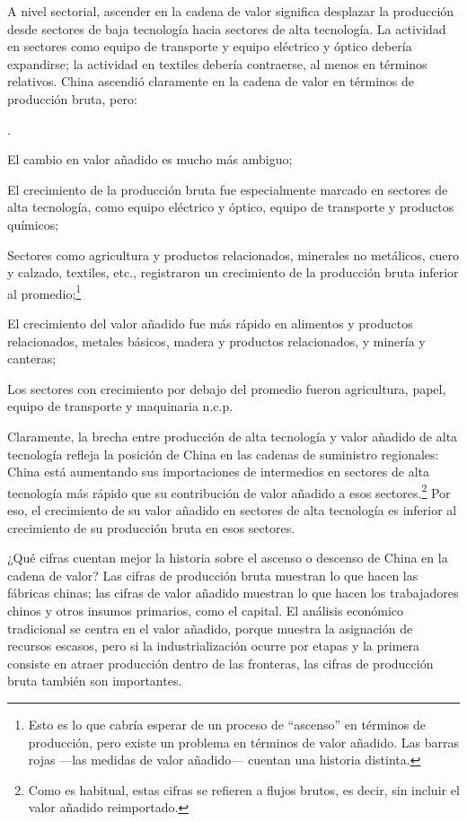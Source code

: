 \documentclass[10pt,a4paper]{article}
\newcounter{numitem}
\newenvironment{lnum}
      {\begin{list}{\arabic{numitem}.}{%
          \usecounter{numitem}%
          \setlength{\leftmargin}{1cm}%
          \setlength{\parskip}{3pt}%
          \setlength{\itemsep}{0pt}%
          \setlength{\parsep}{0pt}%
      }}
      {\end{list}}
\begin{document}
A nivel sectorial, ascender en la cadena de valor significa desplazar la producción desde sectores de baja tecnología hacia sectores de alta tecnología. La actividad en sectores como equipo de transporte y equipo eléctrico y óptico debería expandirse; la actividad en textiles debería contraerse, al menos en términos relativos. China ascendió claramente en la cadena de valor en términos de producción bruta, pero:
\begin{lnum}
    \item El cambio en valor añadido es mucho más ambiguo;
    \item El crecimiento de la producción bruta fue especialmente marcado en sectores de alta tecnología, como equipo eléctrico y óptico, equipo de transporte y productos químicos;
    \item Sectores como agricultura y productos relacionados, minerales no metálicos, cuero y calzado, textiles, etc., registraron un crecimiento de la producción bruta inferior al promedio;\footnote{%
        Esto es lo que cabría esperar de un proceso de “ascenso” en términos de producción, pero existe un problema en términos de valor añadido. Las barras rojas —las medidas de valor añadido— cuentan una historia distinta.
    }
    \item El crecimiento del valor añadido fue más rápido en alimentos y productos relacionados, metales básicos, madera y productos relacionados, y minería y canteras;
    \item Los sectores con crecimiento por debajo del promedio fueron agricultura, papel, equipo de transporte y maquinaria n.c.p.
\end{lnum}

Claramente, la brecha entre producción de alta tecnología y valor añadido de alta tecnología refleja la posición de China en las cadenas de suministro regionales: China está aumentando sus importaciones de intermedios en sectores de alta tecnología más rápido que su contribución de valor añadido a esos sectores.\footnote{%
    Como es habitual, estas cifras se refieren a flujos brutos, es decir, sin incluir el valor añadido reimportado.
} Por eso, el crecimiento de su valor añadido en sectores de alta tecnología es inferior al crecimiento de su producción bruta en esos sectores.

¿Qué cifras cuentan mejor la historia sobre el ascenso o descenso de China en la cadena de valor? Las cifras de producción bruta muestran lo que hacen las fábricas chinas; las cifras de valor añadido muestran lo que hacen los trabajadores chinos y otros insumos primarios, como el capital. El análisis económico tradicional se centra en el valor añadido, porque muestra la asignación de recursos escasos, pero si la industrialización ocurre por etapas y la primera consiste en atraer producción dentro de las fronteras, las cifras de producción bruta también son importantes.
\end{document}
